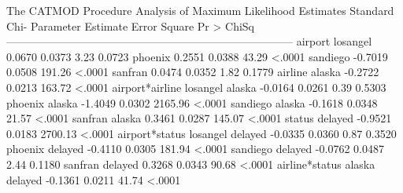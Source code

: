 \documentclass{article}
\begin{document}
\begin{Woutput}
The CATMOD Procedure
                   Analysis of Maximum Likelihood Estimates
                                              Standard       Chi-
Parameter                          Estimate      Error     Square   Pr > ChiSq
------------------------------------------------------------------------------
airport         losangel             0.0670     0.0373       3.23       0.0723
                phoenix              0.2551     0.0388      43.29       <.0001
                sandiego            -0.7019     0.0508     191.26       <.0001
                sanfran              0.0474     0.0352       1.82       0.1779
airline         alaska              -0.2722     0.0213     163.72       <.0001
airport*airline losangel alaska     -0.0164     0.0261       0.39       0.5303
                phoenix alaska      -1.4049     0.0302    2165.96       <.0001
                sandiego alaska     -0.1618     0.0348      21.57       <.0001
                sanfran alaska       0.3461     0.0287     145.07       <.0001
status          delayed             -0.9521     0.0183    2700.13       <.0001
airport*status  losangel delayed    -0.0335     0.0360       0.87       0.3520
                phoenix delayed     -0.4110     0.0305     181.94       <.0001
                sandiego delayed    -0.0762     0.0487       2.44       0.1180
                sanfran delayed      0.3268     0.0343      90.68       <.0001
airline*status  alaska delayed      -0.1361     0.0211      41.74       <.0001
\end{Woutput}
\end{document}
